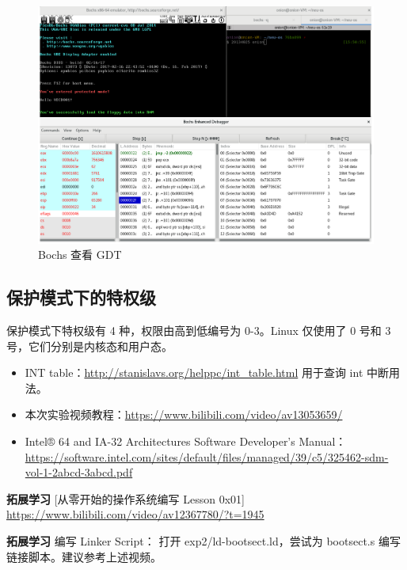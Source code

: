 \begin{figure}[htbp]
    \centering
    \includegraphics[width=\textwidth]{img/Bochs查看GDT.pdf}
    \caption{Bochs 查看 GDT}
    \label{fig:Bochs查看GDT}
\end{figure}

\subsection{保护模式下的特权级}

保护模式下特权级有 4 种，权限由高到低编号为 0-3。Linux 仅使用了 0 号和 3 号，它们分别是内核态和用户态。

\begin{itemize}
    \item INT table：\url{http://stanislavs.org/helppc/int_table.html} 用于查询 int 中断用法。
    \item 本次实验视频教程：\url{https://www.bilibili.com/video/av13053659/}
    \item Intel® 64 and IA-32 Architectures Software Developer’s Manual：\url{https://software.intel.com/sites/default/files/managed/39/c5/325462-sdm-vol-1-2abcd-3abcd.pdf}
\end{itemize}

\begin{mdframed}[hidealllines=true,backgroundcolor=gray!20]
\textbf{拓展学习 }
[从零开始的操作系统编写 Lesson 0x01] \url{ https://www.bilibili.com/video/av12367780/?t=1945}
\end{mdframed}

\begin{mdframed}[hidealllines=true,backgroundcolor=gray!20]
\textbf{拓展学习 }编写 Linker Script：
打开 exp2/ld-bootsect.ld，尝试为 bootsect.s
编写链接脚本。建议参考上述视频。
\end{mdframed}